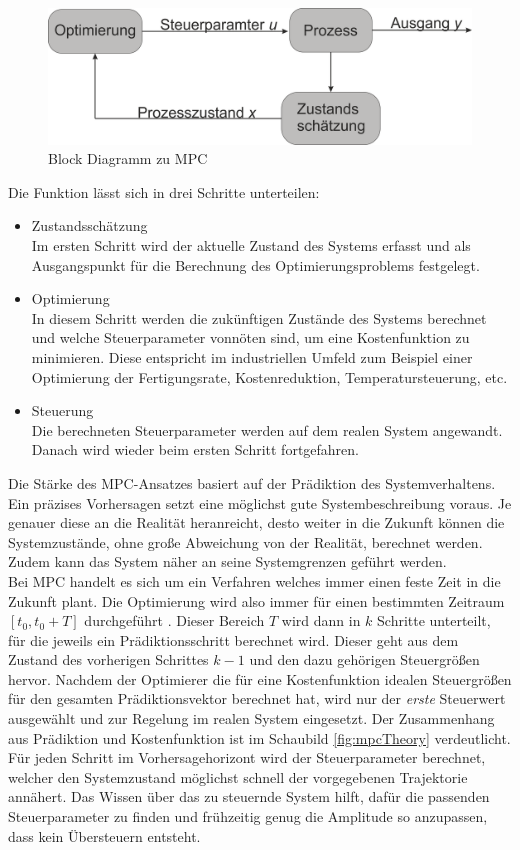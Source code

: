 \documentclass{like}
\begin{document}
  \begin{figure}[ht!]
  	\centering
  	\includegraphics[width=350pt]{Abbildungen/mpcBlockDiagram.png}
  	\caption{Block Diagramm zu MPC}
  	\label{fig:mpcBlock}
  \end{figure}

Die Funktion lässt sich in drei Schritte unterteilen:
\begin{itemize}
	\item Zustandsschätzung \\ Im ersten Schritt wird der aktuelle Zustand des Systems erfasst und als Ausgangspunkt für die Berechnung des Optimierungsproblems festgelegt.
	\item Optimierung \\ In diesem Schritt werden die zukünftigen Zustände des Systems berechnet und welche Steuerparameter vonnöten sind, um eine Kostenfunktion zu minimieren. Diese entspricht im industriellen Umfeld zum Beispiel einer Optimierung der Fertigungsrate, Kostenreduktion,  Temperatursteuerung, etc.
	\item Steuerung \\ Die berechneten Steuerparameter werden auf dem realen System angewandt. Danach wird wieder beim ersten Schritt fortgefahren.   
\end{itemize}


Die Stärke des \ac{MPC}-Ansatzes basiert auf der Prädiktion des Systemverhaltens. Ein präzises Vorhersagen setzt eine möglichst gute Systembeschreibung voraus. Je genauer diese an die Realität heranreicht, desto weiter in die Zukunft können die Systemzustände, ohne große Abweichung von der Realität, berechnet werden. Zudem kann das System näher an seine Systemgrenzen geführt werden. \\
Bei \ac{MPC} handelt es sich um ein Verfahren welches immer einen feste Zeit in die Zukunft plant. Die Optimierung wird also immer für einen bestimmten Zeitraum $ [t_0, t_0 + T] $ durchgeführt . Dieser Bereich \(T\) wird dann in \(k\) Schritte unterteilt, für die jeweils ein Prädiktionsschritt berechnet wird. Dieser geht aus dem Zustand des vorherigen Schrittes $k -1$ und den dazu gehörigen Steuergrößen hervor. Nachdem der Optimierer die für eine Kostenfunktion idealen Steuergrößen für den gesamten Prädiktionsvektor berechnet hat, wird nur der \emph{erste} Steuerwert ausgewählt und zur Regelung im realen System eingesetzt. Der Zusammenhang aus Prädiktion und Kostenfunktion ist im Schaubild \ref{fig:mpcTheory} verdeutlicht. Für jeden Schritt im Vorhersagehorizont wird der Steuerparameter berechnet, welcher den Systemzustand möglichst schnell der vorgegebenen Trajektorie annähert. Das Wissen über das zu steuernde System hilft, dafür die passenden Steuerparameter zu finden und frühzeitig genug die Amplitude so anzupassen, dass kein Übersteuern entsteht. 
\end{document}
